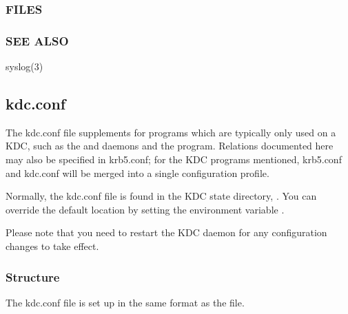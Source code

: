 \documentclass[letterpaper,10pt,english]{sphinxmanual}
\begin{document}
\subsubsection{FILES}
\label{\detokenize{admin/conf_files/krb5_conf:files}}


\subsubsection{SEE ALSO}
\label{\detokenize{admin/conf_files/krb5_conf:see-also}}
syslog(3)


\subsection{kdc.conf}
\label{\detokenize{admin/conf_files/kdc_conf:kdc-conf}}\label{\detokenize{admin/conf_files/kdc_conf::doc}}\label{\detokenize{admin/conf_files/kdc_conf:kdc-conf-5}}
The kdc.conf file supplements {\hyperref[\detokenize{admin/conf_files/krb5_conf:krb5-conf-5}]{}} for programs which
are typically only used on a KDC, such as the {\hyperref[\detokenize{admin/admin_commands/krb5kdc:krb5kdc-8}]{}} and
{\hyperref[\detokenize{admin/admin_commands/kadmind:kadmind-8}]{}} daemons and the {\hyperref[\detokenize{admin/admin_commands/kdb5_util:kdb5-util-8}]{}} program.
Relations documented here may also be specified in krb5.conf; for the
KDC programs mentioned, krb5.conf and kdc.conf will be merged into a
single configuration profile.

Normally, the kdc.conf file is found in the KDC state directory,
{\hyperref[\detokenize{mitK5defaults:paths}]{}}.  You can override the default location by setting the
environment variable .

Please note that you need to restart the KDC daemon for any configuration
changes to take effect.


\subsubsection{Structure}
\label{\detokenize{admin/conf_files/kdc_conf:structure}}
The kdc.conf file is set up in the same format as the
{\hyperref[\detokenize{admin/conf_files/krb5_conf:krb5-conf-5}]{}} file.
\end{document}
